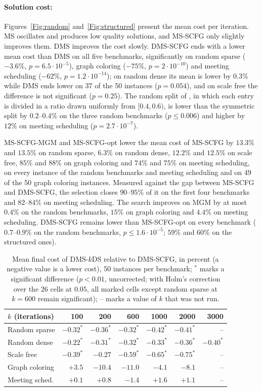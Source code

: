 \paragraph{Solution cost:}
Figures~\ref{Fig:random} and~\ref{Fig:structured} present the mean cost per iteration. MS oscillates and produces low quality solutions, and MS-SCFG only slightly improves them. DMS improves the cost slowly. DMS-SCFG ends with a lower mean cost than DMS on all five benchmarks, significantly on random sparse ($-3.6\%$, $p = 6.5\cdot 10^{-5}$), graph coloring ($-75\%$, $p = 2\cdot 10^{-10}$) and meeting scheduling ($-62\%$, $p = 1.2\cdot 10^{-14}$); on random dense its mean is lower by $0.3\%$ while DMS ends lower on 37 of the 50 instances ($p = 0.054$), and on scale free the difference is not significant ($p = 0.25$). The random split of \citet{CohenGZ20}, in which each entry is divided in a ratio drawn uniformly from $[0.4, 0.6)$, is lower than the symmetric split by $0.2$--$0.4\%$ on the three random benchmarks ($p \le 0.006$) and higher by $12\%$ on meeting scheduling ($p = 2.7\cdot 10^{-7}$).

MS-SCFG-MGM and MS-SCFG-opt lower the mean cost of MS-SCFG by $13.3\%$ and $13.5\%$ on random sparse, $6.3\%$ on random dense, $12.2\%$ and $12.5\%$ on scale free, $85\%$ and $88\%$ on graph coloring and $74\%$ and $75\%$ on meeting scheduling, on every instance of the random benchmarks and meeting scheduling and on 49 of the 50 graph coloring instances. Measured against the gap between MS-SCFG and DMS-SCFG, the selection closes $90$--$95\%$ of it on the first four benchmarks and $82$--$84\%$ on meeting scheduling. The search improves on MGM by at most $0.4\%$ on the random benchmarks, $15\%$ on graph coloring and $4.4\%$ on meeting scheduling. DMS-SCFG remains lower than MS-SCFG-opt on every benchmark ($0.7$--$0.9\%$ on the random benchmarks, $p \le 1.6\cdot 10^{-5}$; $59\%$ and $60\%$ on the structured ones).

\begin{table}[t]
\centering
\small
\caption{Mean final cost of DMS-$k$DS relative to DMS-SCFG, in percent (a negative value is a lower cost), 50 instances per benchmark; $^{*}$ marks a significant difference ($p < 0.01$, uncorrected; with Holm's correction over the 26 cells at $0.05$, all marked cells except random sparse at $k = 600$ remain significant); -- marks a value of $k$ that was not run.}
\label{Tab:delay}
\begin{tabular}{lrrrrrr}
$k$ (iterations) & 100 & 200 & 600 & 1000 & 2000 & 3000 \\ \hline
Random sparse & $-0.32^{*}$ & $-0.36^{*}$ & $-0.32^{*}$ & $-0.42^{*}$ & $-0.41^{*}$ & -- \\
Random dense & $-0.22^{*}$ & $-0.31^{*}$ & $-0.32^{*}$ & $-0.33^{*}$ & $-0.36^{*}$ & $-0.40^{*}$ \\
Scale free & $-0.39^{*}$ & $-0.27$ & $-0.59^{*}$ & $-0.65^{*}$ & $-0.75^{*}$ & -- \\
Graph coloring & $+3.5$ & $-10.4$ & $-11.0$ & $-4.1$ & $-8.1$ & -- \\
Meeting sched. & $+0.1$ & $+0.8$ & $-1.4$ & $+1.6$ & $+1.1$ & -- \\
\end{tabular}
\end{table}

